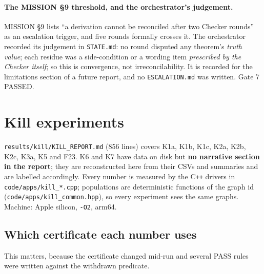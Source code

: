 \documentclass[10pt,a4paper]{article}
\newcommand{\fn}[1]{\nolinkurl{#1}}
\begin{document}
\paragraph{The MISSION \S9 threshold, and the orchestrator's judgement.}
MISSION \S9 lists ``a derivation cannot be reconciled after two Checker rounds'' as an
escalation trigger, and five rounds formally crosses it. The orchestrator recorded its
judgement in \fn{STATE.md}: no round disputed any theorem's \emph{truth value}; each residue was
a side-condition or a wording item \emph{prescribed by the Checker itself}; so this is
convergence, not irreconcilability. It is recorded for the limitations section of a future
report, and no \fn{ESCALATION.md} was written. Gate 7 PASSED.

\section{Kill experiments}
\label{sec:kill}

\fn{results/kill/KILL_REPORT.md} (856 lines) covers K1a, K1b, K1c, K2a, K2b, K2c, K3a, K5 and
F23. K6 and K7 have data on disk but \textbf{no narrative section in the report}; they are
reconstructed here from their CSVs and summaries and are labelled accordingly. Every number is
measured by the C\texttt{++} drivers in \fn{code/apps/kill_*.cpp}; populations are deterministic
functions of the graph id (\fn{code/apps/kill_common.hpp}), so every experiment sees the same
graphs. Machine: Apple silicon, \texttt{-O2}, arm64.

\subsection{Which certificate each number uses}

This matters, because the certificate changed mid-run and several PASS rules were written
against the withdrawn predicate.
\end{document}
